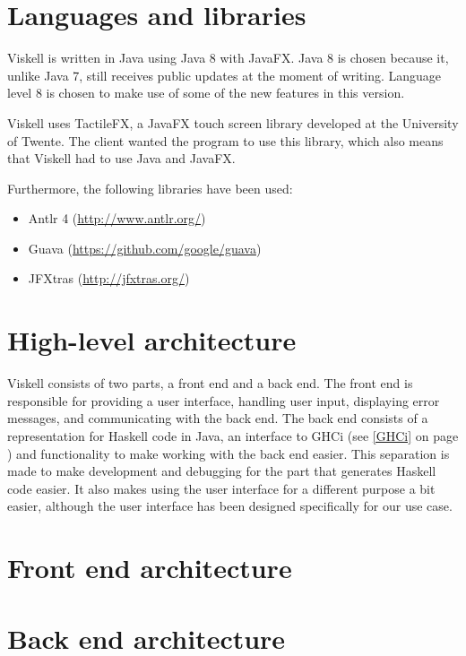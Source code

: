 \section{Languages and libraries}

Viskell is written in Java using Java 8 with JavaFX. 
Java 8 is chosen because it, unlike Java 7, still receives public updates at the moment of writing.
Language level 8 is chosen to make use of some of the new features in this version.

Viskell uses TactileFX, a JavaFX touch screen library developed at the University of Twente.
The client wanted the program to use this library, which also means that Viskell had to use Java and JavaFX.

Furthermore, the following libraries have been used:

\begin{itemize}
	\item Antlr 4 (\url{http://www.antlr.org/})
	\item Guava (\url{https://github.com/google/guava})
	\item JFXtras (\url{http://jfxtras.org/})
\end{itemize}

\section{High-level architecture}

Viskell consists of two parts, a front end and a back end.  
The front end is responsible for providing a user interface, handling user input, displaying error messages, and communicating with the back end.
The back end consists of a representation for Haskell code in Java, an interface to GHCi (see \ref{GHCi} on page \pageref{GHCi}) and functionality to make working with the back end easier.
This separation is made to make development and debugging for the part that generates Haskell code easier.
It also makes using the user interface for a different purpose a bit easier, although the user interface has been designed specifically for our use case.

\section{Front end architecture}

\section{Back end architecture}

